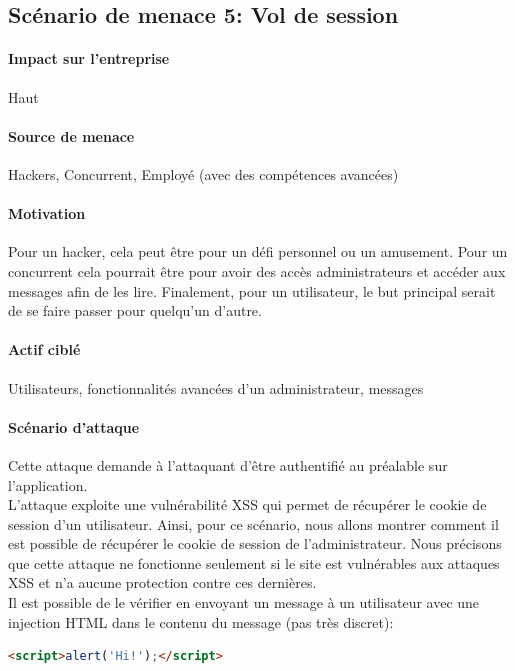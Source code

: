 \documentclass[a4paper,10pt]{article}
\begin{document}
    \subsection*{Scénario de menace 5: Vol de session}
        \paragraph{Impact sur l'entreprise} Haut
        \paragraph{Source de menace} Hackers, Concurrent, Employé (avec des compétences avancées)
        \paragraph{Motivation} Pour un hacker, cela peut être pour un défi personnel ou un amusement. Pour un concurrent cela pourrait être pour avoir des accès administrateurs et accéder aux messages afin de les lire. Finalement, pour un utilisateur, le but principal serait de se faire passer pour quelqu'un d'autre.
        \paragraph{Actif ciblé} Utilisateurs, fonctionnalités avancées d'un administrateur, messages
        \paragraph{Scénario d'attaque} Cette attaque demande à l'attaquant d'être authentifié au préalable sur l'application. \\
        
        L'attaque exploite une vulnérabilité XSS qui permet de récupérer le cookie de session d'un utilisateur. Ainsi, pour ce scénario, nous allons montrer comment il est possible de récupérer le cookie de session de l'administrateur. Nous précisons que cette attaque ne fonctionne seulement si le site est vulnérables aux attaques XSS et n'a aucune protection contre ces dernières. \\
        
        Il est possible de le vérifier en envoyant un message à un utilisateur avec une injection HTML dans le contenu du message (pas très discret):
        \begin{lstlisting}[language=html]
<script>alert('Hi!');</script>
\end{lstlisting} 
\end{document}
